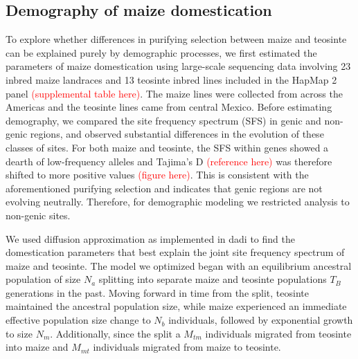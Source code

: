 \documentclass{pnastwo}
\begin{document}
\begin{article}
\subsection{Demography of maize domestication}
To explore whether differences in purifying selection between maize
and teosinte can be explained purely by demographic processes, we
first estimated the parameters of maize domestication using large-scale
sequencing data involving 23 inbred maize
landraces and 13 teosinte inbred lines included in the HapMap 2 panel
\cite{hapmap2} \textcolor{red}{(supplemental table here)}. The maize
lines were collected from across the Americas and the teosinte lines
came from central Mexico. Before estimating demography, we compared
the site frequency spectrum (SFS) in genic and non-genic regions, and
observed substantial differences in the evolution of these classes of
sites. For both maize and teosinte, the SFS within genes showed a
dearth of low-frequency alleles and Tajima's D
\textcolor{red}{(reference here)} was therefore shifted
to more positive values \textcolor{red}{(figure here)}. This is consistent with the aforementioned purifying
selection and indicates that genic regions are not evolving
neutrally. Therefore, for demographic modeling we restricted analysis
to non-genic sites.  

We used diffusion approximation as implemented in
dadi \cite{dadi} to find the domestication parameters that best explain
the joint site frequency spectrum of maize and teosinte.  The model we optimized began with an
equilibrium ancestral population of size $N_a$
splitting into separate maize and teosinte populations $T_B$ generations in the past. Moving forward in
time from the split, teosinte maintained the ancestral population size, while
maize experienced an immediate effective population size change to
$N_b$ individuals, followed by exponential growth to size
$N_m$. Additionally, since the split a $M_{tm}$ individuals migrated
from teosinte into maize and $M_{mt}$ individuals migrated from maize
to teosinte. 


\end{article}
\end{document}
